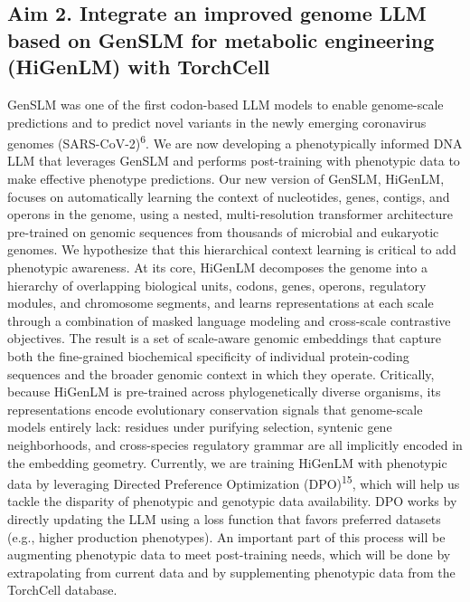 
\subsection{Aim 2. Integrate an improved genome LLM based on GenSLM for metabolic
engineering (HiGenLM) with TorchCell}\label{sec:aim2}

GenSLM was one of the first codon-based LLM models to enable genome-scale predictions
and to predict novel variants in the newly emerging coronavirus genomes
(SARS-CoV-2)\textsuperscript{6}. We are now developing a phenotypically informed DNA
LLM that leverages GenSLM and performs post-training with phenotypic data to make
effective phenotype predictions. Our new version of GenSLM, HiGenLM, focuses on
automatically learning the context of nucleotides, genes, contigs, and operons in
the genome, using a nested, multi-resolution transformer architecture pre-trained on
genomic sequences from thousands of microbial and eukaryotic genomes. We hypothesize
that this hierarchical context learning is critical to add phenotypic awareness. At
its core, HiGenLM decomposes the genome into a hierarchy of overlapping biological
units, codons, genes, operons, regulatory modules, and chromosome segments, and
learns representations at each scale through a combination of masked language
modeling and cross-scale contrastive objectives. The result is a set of scale-aware
genomic embeddings that capture both the fine-grained biochemical specificity of
individual protein-coding sequences and the broader genomic context in which they
operate. Critically, because HiGenLM is pre-trained across phylogenetically diverse
organisms, its representations encode evolutionary conservation signals that
genome-scale models entirely lack: residues under purifying selection, syntenic gene
neighborhoods, and cross-species regulatory grammar are all implicitly encoded in
the embedding geometry. Currently, we are training HiGenLM with phenotypic data by
leveraging Directed Preference Optimization (DPO)\textsuperscript{15}, which will
help us tackle the disparity of phenotypic and genotypic data availability. DPO
works by directly updating the LLM using a loss function that favors preferred
datasets (e.g., higher production phenotypes). An important part of this process
will be augmenting phenotypic data to meet post-training needs, which will be done
by extrapolating from current data and by supplementing phenotypic data from the
TorchCell database.

